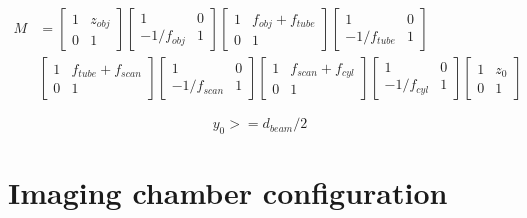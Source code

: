 \documentclass[12pt]{article}
\begin{document}
\begin{equation}
\begin{split}
  M &= \begin{bmatrix} 1 & z_{obj} \\ 0 & 1 \end{bmatrix}
      \begin{bmatrix} 1 & 0 \\ -1/f_{obj} & 1 \end{bmatrix}
      \begin{bmatrix} 1 & f_{obj} + f_{tube} \\ 0 & 1 \end{bmatrix}
      \begin{bmatrix} 1 & 0 \\ -1/f_{tube} & 1 \end{bmatrix} \\
    &  \begin{bmatrix} 1 & f_{tube} + f_{scan} \\ 0 & 1 \end{bmatrix}
      \begin{bmatrix} 1 & 0 \\ -1/f_{scan} & 1 \end{bmatrix}
      \begin{bmatrix} 1 & f_{scan} + f_{cyl} \\ 0 & 1 \end{bmatrix}
      \begin{bmatrix} 1 & 0 \\ -1/f_{cyl} & 1 \end{bmatrix}
      \begin{bmatrix} 1 & z_{0} \\ 0 & 1 \end{bmatrix}
  \label{eq:gen_matrix}
\end{split}
\end{equation}


\begin{equation} 
    y_0 >= d_{beam} / 2
    \label{eq:max_y_0}
\end{equation}


\section*{Imaging chamber configuration}
\end{document}
